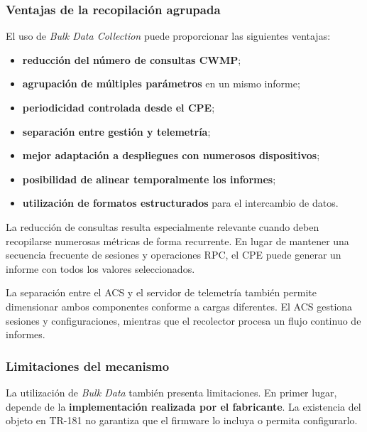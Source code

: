 \subsubsection*{Ventajas de la recopilación agrupada}

El uso de \textit{Bulk Data Collection} puede proporcionar las siguientes
ventajas:

\begin{itemize}
    \item \textbf{reducción del número de consultas CWMP};

    \item \textbf{agrupación de múltiples parámetros} en un mismo
    informe;

    \item \textbf{periodicidad controlada desde el CPE};

    \item \textbf{separación entre gestión y telemetría};

    \item \textbf{mejor adaptación a despliegues con numerosos
    dispositivos};

    \item \textbf{posibilidad de alinear temporalmente los informes};

    \item \textbf{utilización de formatos estructurados} para el
    intercambio de datos.
\end{itemize}

La reducción de consultas resulta especialmente relevante cuando deben
recopilarse numerosas métricas de forma recurrente. En lugar de mantener
una secuencia frecuente de sesiones y operaciones RPC, el CPE puede
generar un informe con todos los valores seleccionados.

La separación entre el ACS y el servidor de telemetría también permite
dimensionar ambos componentes conforme a cargas diferentes. El ACS
gestiona sesiones y configuraciones, mientras que el recolector procesa
un flujo continuo de informes.


\subsubsection*{Limitaciones del mecanismo}

La utilización de \textit{Bulk Data} también presenta limitaciones. En
primer lugar, depende de la
\textbf{implementación realizada por el fabricante}. La existencia del
objeto en TR-181 no garantiza que el firmware lo incluya o permita
configurarlo.

